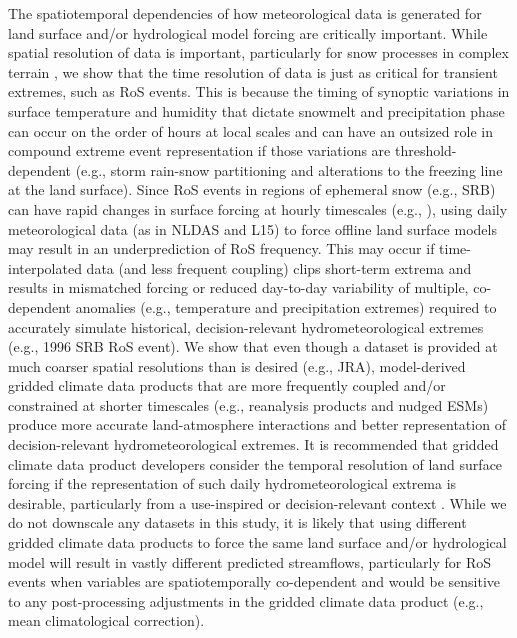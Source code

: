 \documentclass[draft]{agujournal2019}
\begin{document}
The spatiotemporal dependencies of how meteorological data is generated for land surface and/or hydrological model forcing are critically important. 
While spatial resolution of data is important, particularly for snow processes in complex terrain \citep{henn2018an,Woodburn2021}, we show that the time resolution of data is just as critical for transient extremes, such as RoS events.
This is because the timing of synoptic variations in surface temperature and humidity that dictate snowmelt and precipitation phase can occur on the order of hours at local scales and can have an outsized role in compound extreme event representation if those variations are threshold-dependent (e.g., storm rain-snow partitioning and alterations to the freezing line at the land surface).
Since RoS events in regions of ephemeral snow (e.g., SRB) can have rapid changes in surface forcing at hourly timescales (e.g., \citet{leathers1998severe}), using daily meteorological data (as in NLDAS and L15) to force offline land surface models may result in an underprediction of RoS frequency. 
This may occur if time-interpolated data (and less frequent coupling) clips short-term extrema and results in mismatched forcing or reduced day-to-day variability of multiple, co-dependent anomalies (e.g., temperature and precipitation extremes) required to accurately simulate historical, decision-relevant hydrometeorological extremes (e.g., 1996 SRB RoS event). 
We show that even though a dataset is provided at much coarser spatial resolutions than is desired (e.g., JRA), model-derived gridded climate data products that are more frequently coupled and/or constrained at shorter timescales (e.g., reanalysis products and nudged ESMs) produce more accurate land-atmosphere interactions and better representation of decision-relevant hydrometeorological extremes. 
It is recommended that gridded climate data product developers consider the temporal resolution of land surface forcing if the representation of such daily hydrometeorological extrema is desirable, particularly from a use-inspired or decision-relevant context \citep{Jagannathan2021}.
While we do not downscale any datasets in this study, it is likely that using different gridded climate data products to force the same land surface and/or hydrological model will result in vastly different predicted streamflows, particularly for RoS events when variables are spatiotemporally co-dependent and would be sensitive to any post-processing adjustments in the gridded climate data product (e.g., mean climatological correction). 
\end{document}
